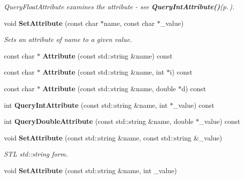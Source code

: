 \begin{CompactItemize}
\begin{CompactList}\small\item\em Query\-Float\-Attribute examines the attribute - see {\bf Query\-Int\-Attribute()}{\rm (p.\,\pageref{classTiXmlElement_TiXmlElementa8})}. \item\end{CompactList}\item 
void {\bf Set\-Attribute} (const char $\ast$name, const char $\ast$\_\-value)
\begin{CompactList}\small\item\em Sets an attribute of name to a given value. \item\end{CompactList}\item 
const char $\ast$ {\bf Attribute} (const std::string \&name) const\label{classTiXmlElement_TiXmlElementa12}

\item 
const char $\ast$ {\bf Attribute} (const std::string \&name, int $\ast$i) const\label{classTiXmlElement_TiXmlElementa13}

\item 
const char $\ast$ {\bf Attribute} (const std::string \&name, double $\ast$d) const\label{classTiXmlElement_TiXmlElementa14}

\item 
int {\bf Query\-Int\-Attribute} (const std::string \&name, int $\ast$\_\-value) const\label{classTiXmlElement_TiXmlElementa15}

\item 
int {\bf Query\-Double\-Attribute} (const std::string \&name, double $\ast$\_\-value) const\label{classTiXmlElement_TiXmlElementa16}

\item 
void {\bf Set\-Attribute} (const std::string \&name, const std::string \&\_\-value)\label{classTiXmlElement_TiXmlElementa17}

\begin{CompactList}\small\item\em STL std::string form. \item\end{CompactList}\item 
void {\bf Set\-Attribute} (const std::string \&name, int \_\-value)\label{classTiXmlElement_TiXmlElementa18}


\end{CompactItemize}

